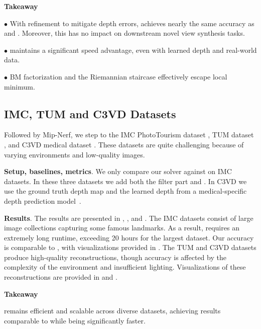 \begin{tcolorbox}
    \begin{center}
        \vspace{-1mm}
        \textbf{Takeaway}
        \vspace{-1mm}
    \end{center} 
    $\bullet$ With \ceres refinement to mitigate depth errors, \nameshort achieves nearly the same accuracy as \colmap and \glomap. Moreover, this has no impact on downstream novel view synthesis tasks.  

    $\bullet$ \nameshort maintains a significant speed advantage, even with learned depth and real-world data.  

    $\bullet$ BM factorization and the Riemannian staircase effectively escape local minimum.  
\end{tcolorbox}

\subsection{IMC, TUM and C3VD Datasets}\label{sec:exp-imc-tum}


Followed by Mip-Nerf, we step to the IMC PhotoTourism dataset \cite{imc2023}, TUM dataset \cite{sturm12tum}, and C3VD medical dataset \cite{bobrow2023}. These datasets are quite challenging because of varying environments and low-quality images.

\textbf{Setup, baselines, metrics}.
We only compare our \nameshort solver against \glomap on IMC datasets. In these three datasets we add both the filter part and \xmdouble. In C3VD we use the ground truth depth map and the learned depth from a medical-specific depth prediction model~\cite{paruchuri2024leveraging}. 

\textbf{Results}.
The results are presented in , , and . The IMC datasets consist of large image collections capturing some famous landmarks. As a result, \glomap requires an extremely long runtime, exceeding 20 hours for the largest dataset. Our accuracy is comparable to \glomap, with visualizations provided in . The TUM and C3VD datasets produce high-quality reconstructions, though accuracy is affected by the complexity of the environment and insufficient lighting. Visualizations of these reconstructions are provided in  and .  

\begin{tcolorbox}
    \begin{center}
        \vspace{-1mm}
        \textbf{Takeaway}
        \vspace{-1mm}
    \end{center} 
    \nameshort remains efficient and scalable across diverse datasets, achieving results comparable to \glomap while being significantly faster.
\end{tcolorbox}






